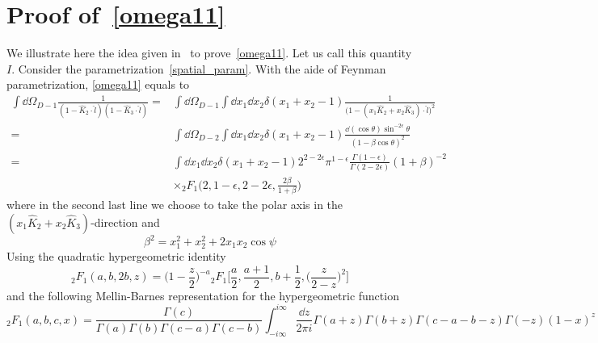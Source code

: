 \section{Proof of~\cref{omega11}}\label{appendix-omega11}
We illustrate here the idea given in~\cite{Somogyi:2011ir} to prove~\cref{omega11}.
Let us call this quantity $I$.
Consider the parametrization~\cref{spatial_param}.
With the aide of Feynman parametrization, \cref{omega11} equals to
\begin{equation}\label{omega11i}
\begin{split}
\int\dd\Omega_{D-1}\frac{1}{(1-\hat{K}_2\cdot\hat{l})(1-\hat{K}_3\cdot\hat{l})}
= &
\int\dd\Omega_{D-1}\int\dd x_1\dd x_2\delta(x_1+x_2-1)\frac{1}{\big(1-(x_1\hat{K}_2 + x_2\hat{K}_3)\cdot\hat{l}
\big)^2}
\\
=&
\int\dd\Omega_{D-2}\int\dd x_1\dd x_2\delta(x_1+x_2-1)
\frac{\dd(\cos\theta) \sin^{-2\epsilon}\theta}{(1-\beta\cos\theta)^2}
\\
=&
\int\dd x_1\dd x_2 \delta(x_1+x_2-1)2^{2-2\epsilon}\pi^{1-\epsilon}\frac{\Gamma(1-\epsilon)}{\Gamma(2-2\epsilon)}(1+\beta)^{-2}
\\
& \times
{}_2F_1\big(2,1-\epsilon, 2-2\epsilon,\frac{2\beta}{1+\beta}\big)
\end{split}
\end{equation}
where in the second last line we choose to take the polar axis in the $(x_1\hat{K}_2 + x_2\hat{K}_3)$-direction and
\begin{equation*}
\beta^2 = x_1^2 + x_2^2 + 2x_1x_2\cos\psi
\end{equation*}
%
%
%
\iffalse %
\begin{equation*}
\frac{1}{(x+y)^\lambda} = \frac{1}{\Gamma(\lambda)}
\frac{1}{2\pi i}\int^{i\infty}_{-i\infty}\dd z \Gamma(\lambda + z)\Gamma(-z)\frac{y^z}{x^{\lambda+z}}
\end{equation*}
to write the above equation as
\fi %
%
%
%
Using the quadratic hypergeometric identity
\begin{equation*}
{}_2F_1(a,b,2b,z)=\big(1-\frac{z}{2}\big)^{-a}{}_2F_1\big[\frac{a}{2},\frac{a+1}{2}, b+\frac{1}{2}, \big(\frac{z}{2-z}\big)^2\big]
\end{equation*}
and the following Mellin-Barnes representation for the hypergeometric function
\begin{equation*}
{}_2F_1(a,b,c,x) = \frac{\Gamma(c)}{\Gamma(a)\Gamma(b)\Gamma(c-a)\Gamma(c-b)}\int_{-i\infty}^{i\infty}\frac{\dd z}{2\pi i}\Gamma(a+z)\Gamma(b+z)\Gamma(c-a-b-z)\Gamma(-z)(1-x)^z
\end{equation*}
